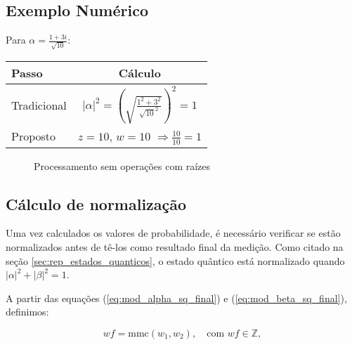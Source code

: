 \documentclass[12pt, a4paper]{article}
\begin{document}
\subsection*{Exemplo Numérico}

Para \(\alpha = \frac{1 + 3i}{\sqrt{10}}\):
\begin{table}[h]
\centering
\begin{tabular}{lc}
\toprule
\textbf{Passo} & \textbf{Cálculo} \\
\midrule
Tradicional & \(|\alpha|^2 = \left(\sqrt{\frac{1^2 + 3^2}{\sqrt{10}^2}}\right)^2 = 1\) \\
Proposto & \(z = 10\), \(w = 10\) \(\Rightarrow \frac{10}{10} = 1\) \\
\bottomrule
\end{tabular}
\end{table}

\begin{figure}[h]
\centering
{}
\caption{Processamento sem operações com raízes}
\label{fig:fluxo}
\end{figure}

\subsection{Cálculo de normalização}

Uma vez calculados os valores de probabilidade, é necessário verificar se estão normalizados antes de tê-los como resultado final da medição. Como citado na seção \ref{sec:rep_estados_quanticos}, o estado quântico está normalizado quando \(|\alpha|^2+|\beta|^2=1\).

A partir das equações (\ref{eq:mod_alpha_sq_final}) e (\ref{eq:mod_beta_sq_final}), definimos:

\begin{equation}
wf=\text{mmc}(w_1, w_2), \quad  \text{com } wf \in \mathbb{Z},
\label{eq:wf}
\end{equation}
\end{document}
